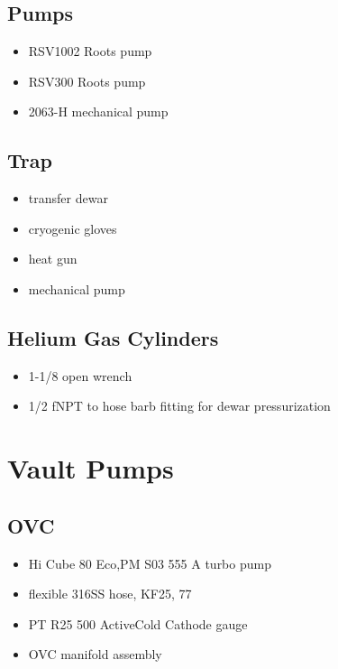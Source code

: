   \subsection{\hef{} Pumps}
\begin{itemize}
 \item {} RSV1002 Roots pump
 \item {} RSV300 Roots pump
 \item {} 2063-H mechanical pump
\end{itemize}

  \subsection{\lnn{} Trap}
\begin{itemize}
 \item \lnn{} transfer dewar
\item cryogenic gloves
\item heat gun
\item mechanical pump
\end{itemize}

  \subsection{Helium Gas Cylinders}
\begin{itemize}
 \item 1-1/8\inches{} open wrench
 \item 1/2\inches{} fNPT to hose barb fitting for dewar pressurization
\end{itemize}


  
\section{Vault Pumps}
  \subsection{OVC}
\begin{itemize}
 \item {} Hi Cube 80 Eco,PM S03 555 A turbo pump
\item {} flexible 316SS hose, KF25, 77\inches
\item {} PT R25 500 ActiveCold Cathode gauge
\item OVC manifold assembly
\end{itemize}

